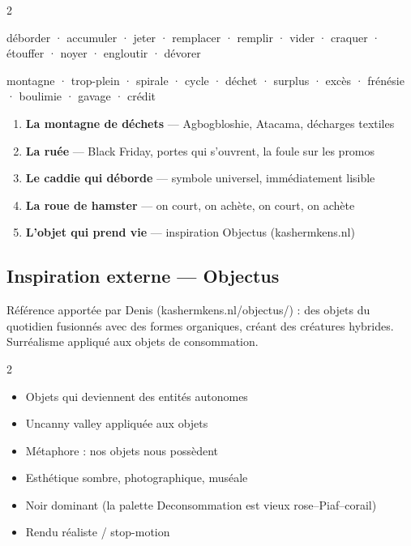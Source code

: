 \documentclass[a4paper,11pt]{article}
\newcommand{\doitem}[1]{\item[\textcolor{bleenGreen}{\ding{51}}] #1}
\newcommand{\dontitem}[1]{\item[\textcolor{consoPink}{\ding{55}}] #1}
\begin{document}
\begin{multicols}{2}
\begin{tcolorbox}[card, title=Verbes]
déborder · accumuler · jeter · remplacer · remplir · vider · craquer · étouffer · noyer · engloutir · dévorer
\end{tcolorbox}

\begin{tcolorbox}[card, title=Noms]
montagne · trop-plein · spirale · cycle · déchet · surplus · excès · frénésie · boulimie · gavage · crédit
\end{tcolorbox}
\end{multicols}

\begin{tcolorbox}[card, title=Images mentales les plus fortes]
\begin{enumerate}[nosep]
  \item \textbf{La montagne de déchets} — Agbogbloshie, Atacama, décharges textiles
  \item \textbf{La ruée} — Black Friday, portes qui s'ouvrent, la foule sur les promos
  \item \textbf{Le caddie qui déborde} — symbole universel, immédiatement lisible
  \item \textbf{La roue de hamster} — on court, on achète, on court, on achète
  \item \textbf{L'objet qui prend vie} — inspiration Objectus (kashermkens.nl)
\end{enumerate}
\end{tcolorbox}

\subsection{Inspiration externe — Objectus}

Référence apportée par Denis (kashermkens.nl/objectus/) : des objets du quotidien fusionnés avec des formes organiques, créant des créatures hybrides. Surréalisme appliqué aux objets de consommation.

\begin{multicols}{2}
\begin{tcolorbox}[card, title={\color{bleenGreen!80!black}Transférable}, colframe=bleenGreen!30, borderline north={2pt}{0pt}{bleenGreen}]
\begin{itemize}[nosep, leftmargin=12pt]
  \doitem{Objets qui deviennent des entités autonomes}
  \doitem{Uncanny valley appliquée aux objets}
  \doitem{Métaphore : nos objets nous possèdent}
\end{itemize}
\end{tcolorbox}

\begin{tcolorbox}[card, title={\color{consoPink}Non transférable}, colframe=consoPink!30, borderline north={2pt}{0pt}{consoPink}]
\begin{itemize}[nosep, leftmargin=12pt]
  \dontitem{Esthétique sombre, photographique, muséale}
  \dontitem{Noir dominant (la palette Deconsommation est vieux rose–Piaf–corail)}
  \dontitem{Rendu réaliste / stop-motion}
\end{itemize}
\end{tcolorbox}
\end{multicols}
\end{document}
